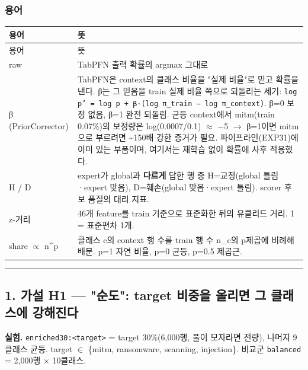 \subsubsection{용어}
\begingroup
\footnotesize
\begin{longtable}{>{\raggedright\arraybackslash}p{}>{\raggedright\arraybackslash}p{}}
\toprule
용어 & 뜻 \\ \midrule
\endfirsthead
용어 & 뜻 \\ \midrule
\endhead
{}raw & TabPFN 출력 확률의 argmax 그대로 \\
{}β (PriorCorrector) & TabPFN은 context의 클래스 비율을 "실제 비율"로 믿고 확률을 낸다. β는 그 믿음을 train 실제 비율 쪽으로 되돌리는 세기: \texttt{log p' =\allowbreak{}\allowbreak{} log p +\allowbreak{}\allowbreak{} β·(log \allowbreak{}π\_\allowbreak{}\allowbreak{}train \allowbreak{}− log π\_\allowbreak{}\allowbreak{}context)\allowbreak{}}. β=\allowbreak{}0 보정 없음, β=\allowbreak{}1 완전 되돌림. 균등 context에서 mitm(train 0.07\%)의 보정량은 log(0.0007/\allowbreak{}0.1) \ensuremath{\approx} −5  \ensuremath{\rightarrow}  β=\allowbreak{}1이면 mitm으로 부르려면 \textasciitilde{}150배 강한 증거가 필요. 파이프라인(EXP31)에 이미 있는 부품이며, 여기서는 재학습 없이 확률에 사후 적용했다. \\
{}H /\allowbreak{} D & expert가 global과 \textbf{다르게} 답한 행 중 H=\allowbreak{}교정(global 틀림·expert 맞음), D=\allowbreak{}훼손(global 맞음·expert 틀림). scorer 후보 품질의 대리 지표. \\
{}z-거리 & 46개 feature를 train 기준으로 표준화한 뒤의 유클리드 거리. 1 =\allowbreak{} 표준편차 1개. \\
{}share \ensuremath{\propto} n\textasciicircum{}p & 클래스 c의 context 행 수를 train 행 수 n\_\allowbreak{}c의 p제곱에 비례해 배분. p=\allowbreak{}1 자연 비율, p=\allowbreak{}0 균등, p=\allowbreak{}0.5 제곱근. \\
\bottomrule
\end{longtable}
\endgroup

\medskip\hrule\medskip
\subsection{1. 가설 H1 — "순도": target 비중을 올리면 그 클래스에 강해진다}
\textbf{실험.} \texttt{enriched\allowbreak{}30:<targ\allowbreak{}et>} =\allowbreak{} target 30\%(6,000행, 풀이 모자라면 전량), 나머지 9클래스 균등. target \ensuremath{\in} \{mitm, ransomware, scanning, injection\}. 비교군 \texttt{balanced\allowbreak{}} =\allowbreak{} 2,000행 × 10클래스.

